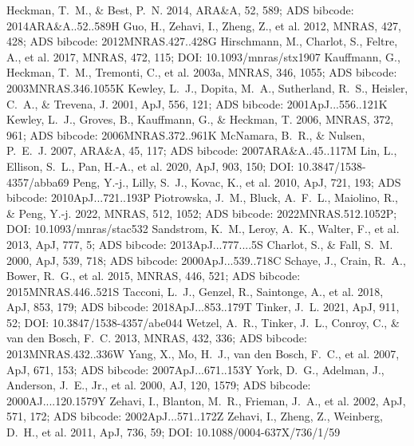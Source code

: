 \documentclass[twocolumn]{aastex631}
\begin{document}
\begin{thebibliography}{}
 Heckman, T.~M., \& Best, P.~N. 2014, ARA\&A, 52, 589; ADS bibcode: 2014ARA\&A..52..589H
 Guo, H., Zehavi, I., Zheng, Z., et al. 2012, MNRAS, 427, 428; ADS bibcode: 2012MNRAS.427..428G
 Hirschmann, M., Charlot, S., Feltre, A., et al. 2017, MNRAS, 472, 115; DOI: 10.1093/mnras/stx1907
 Kauffmann, G., Heckman, T.~M., Tremonti, C., et al. 2003a, MNRAS, 346, 1055; ADS bibcode: 2003MNRAS.346.1055K
 Kewley, L.~J., Dopita, M.~A., Sutherland, R.~S., Heisler, C.~A., \& Trevena, J. 2001, ApJ, 556, 121; ADS bibcode: 2001ApJ...556..121K
 Kewley, L.~J., Groves, B., Kauffmann, G., \& Heckman, T. 2006, MNRAS, 372, 961; ADS bibcode: 2006MNRAS.372..961K
 McNamara, B.~R., \& Nulsen, P.~E.~J. 2007, ARA\&A, 45, 117; ADS bibcode: 2007ARA\&A..45..117M
 Lin, L., Ellison, S.~L., Pan, H.-A., et al. 2020, ApJ, 903, 150; DOI: 10.3847/1538-4357/abba69
 Peng, Y.-j., Lilly, S.~J., Kovac, K., et al. 2010, ApJ, 721, 193; ADS bibcode: 2010ApJ...721..193P
 Piotrowska, J.~M., Bluck, A.~F.~L., Maiolino, R., \& Peng, Y.-j. 2022, MNRAS, 512, 1052; ADS bibcode: 2022MNRAS.512.1052P; DOI: 10.1093/mnras/stac532
 Sandstrom, K.~M., Leroy, A.~K., Walter, F., et al. 2013, ApJ, 777, 5; ADS bibcode: 2013ApJ...777....5S
 Charlot, S., \& Fall, S.~M. 2000, ApJ, 539, 718; ADS bibcode: 2000ApJ...539..718C
 Schaye, J., Crain, R.~A., Bower, R.~G., et al. 2015, MNRAS, 446, 521; ADS bibcode: 2015MNRAS.446..521S
 Tacconi, L.~J., Genzel, R., Saintonge, A., et al. 2018, ApJ, 853, 179; ADS bibcode: 2018ApJ...853..179T
 Tinker, J.~L. 2021, ApJ, 911, 52; DOI: 10.3847/1538-4357/abe044
 Wetzel, A.~R., Tinker, J.~L., Conroy, C., \& van den Bosch, F.~C. 2013, MNRAS, 432, 336; ADS bibcode: 2013MNRAS.432..336W
 Yang, X., Mo, H.~J., van den Bosch, F.~C., et al. 2007, ApJ, 671, 153; ADS bibcode: 2007ApJ...671..153Y
 York, D.~G., Adelman, J., Anderson, J.~E., Jr., et al. 2000, AJ, 120, 1579; ADS bibcode: 2000AJ....120.1579Y
 Zehavi, I., Blanton, M.~R., Frieman, J.~A., et al. 2002, ApJ, 571, 172; ADS bibcode: 2002ApJ...571..172Z
 Zehavi, I., Zheng, Z., Weinberg, D.~H., et al. 2011, ApJ, 736, 59; DOI: 10.1088/0004-637X/736/1/59
\end{thebibliography}
\end{document}
